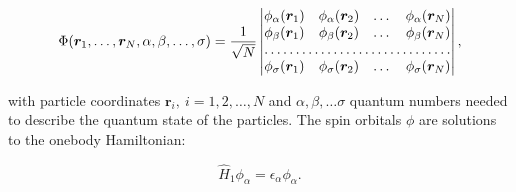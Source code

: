 \begin{equation}
\Phi(\bm{r}_1,\dots,\bm{r}_N, \alpha, \beta, \dots, \sigma)
= \frac{1}{\sqrt{N}}
\begin{vmatrix}
    \phi_{\alpha}(\bm{r}_1) & \phi_{\alpha}(\bm{r}_2) 
    & \dots & \phi_{\alpha}(\bm{r}_N) \\
    \phi_{\beta}(\bm{r}_1)  & \phi_{\beta}(\bm{r}_2)
    & \dots & \phi_{\beta}(\bm{r}_N) \\
    \hdotsfor{4} \\
    \phi_{\sigma}(\bm{r}_1) & \phi_{\sigma}(\bm{r}_2) 
    & \dots & \phi_{\sigma}(\bm{r}_N)
\end{vmatrix} ,
\end{equation}

with particle coordinates $\bm{r}_i, \ i=1,2,\dots,N$
and $\alpha, \beta, \dots \sigma$ quantum numbers
needed to describe the quantum state of the particles.
The spin orbitals $\phi$ are solutions to the onebody
Hamiltonian:

\begin{equation}
    \hat{H}_1 \phi_{\alpha} = \epsilon_{\alpha} \phi_{\alpha} .
\end{equation}



